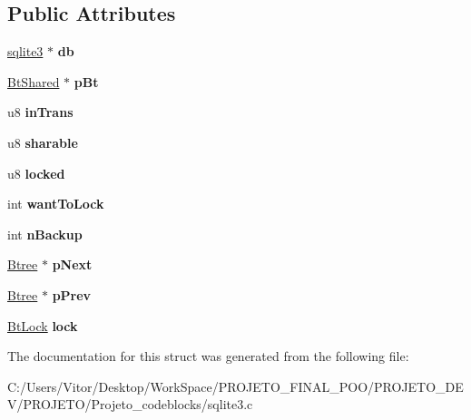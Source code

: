 \subsection*{Public Attributes}
\begin{DoxyCompactItemize}
\item 
\hypertarget{struct_btree_a2b3cfec48b6e9fcfd641d433816ae5c3}{\hyperlink{structsqlite3}{sqlite3} $\ast$ {\bfseries db}}\label{struct_btree_a2b3cfec48b6e9fcfd641d433816ae5c3}

\item 
\hypertarget{struct_btree_a63bab5d744d48d14368af048dddf2f20}{\hyperlink{struct_bt_shared}{Bt\-Shared} $\ast$ {\bfseries p\-Bt}}\label{struct_btree_a63bab5d744d48d14368af048dddf2f20}

\item 
\hypertarget{struct_btree_a50007448960c05dfd1fdc7db3e277685}{u8 {\bfseries in\-Trans}}\label{struct_btree_a50007448960c05dfd1fdc7db3e277685}

\item 
\hypertarget{struct_btree_a114f157127c76a1fbad8292e4b39c4dd}{u8 {\bfseries sharable}}\label{struct_btree_a114f157127c76a1fbad8292e4b39c4dd}

\item 
\hypertarget{struct_btree_a16fc8292bae9a66cfec03f6cb82d06a8}{u8 {\bfseries locked}}\label{struct_btree_a16fc8292bae9a66cfec03f6cb82d06a8}

\item 
\hypertarget{struct_btree_a97368ea300f0b74b8e80ea07da0cea2a}{int {\bfseries want\-To\-Lock}}\label{struct_btree_a97368ea300f0b74b8e80ea07da0cea2a}

\item 
\hypertarget{struct_btree_a7a3e7cf38bc9c3021a9e270a54ecfb1e}{int {\bfseries n\-Backup}}\label{struct_btree_a7a3e7cf38bc9c3021a9e270a54ecfb1e}

\item 
\hypertarget{struct_btree_a9e6d2ca44c10ed8ef0be004225a74ef5}{\hyperlink{struct_btree}{Btree} $\ast$ {\bfseries p\-Next}}\label{struct_btree_a9e6d2ca44c10ed8ef0be004225a74ef5}

\item 
\hypertarget{struct_btree_a0423f1c55c1fe6812161a49bb2bf604f}{\hyperlink{struct_btree}{Btree} $\ast$ {\bfseries p\-Prev}}\label{struct_btree_a0423f1c55c1fe6812161a49bb2bf604f}

\item 
\hypertarget{struct_btree_a943ed8799c9943f753a88cf44f1632dc}{\hyperlink{struct_bt_lock}{Bt\-Lock} {\bfseries lock}}\label{struct_btree_a943ed8799c9943f753a88cf44f1632dc}

\end{DoxyCompactItemize}


The documentation for this struct was generated from the following file\-:\begin{DoxyCompactItemize}
\item 
C\-:/\-Users/\-Vitor/\-Desktop/\-Work\-Space/\-P\-R\-O\-J\-E\-T\-O\-\_\-\-F\-I\-N\-A\-L\-\_\-\-P\-O\-O/\-P\-R\-O\-J\-E\-T\-O\-\_\-\-D\-E\-V/\-P\-R\-O\-J\-E\-T\-O/\-Projeto\-\_\-codeblocks/sqlite3.\-c\end{DoxyCompactItemize}

